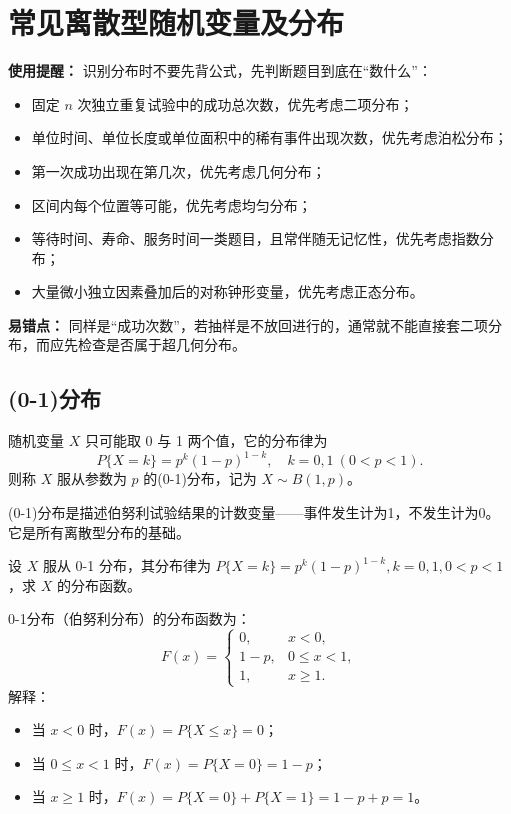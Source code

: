 ﻿\documentclass[lang=cn,11pt]{elegantbook}
\begin{document}
\section{常见离散型随机变量及分布}

\begin{note}
\textbf{使用提醒：} 识别分布时不要先背公式，先判断题目到底在“数什么”：
\begin{itemize}
    \item 固定 \(n\) 次独立重复试验中的成功总次数，优先考虑二项分布；
    \item 单位时间、单位长度或单位面积中的稀有事件出现次数，优先考虑泊松分布；
    \item 第一次成功出现在第几次，优先考虑几何分布；
    \item 区间内每个位置等可能，优先考虑均匀分布；
    \item 等待时间、寿命、服务时间一类题目，且常伴随无记忆性，优先考虑指数分布；
    \item 大量微小独立因素叠加后的对称钟形变量，优先考虑正态分布。
\end{itemize}

\textbf{易错点：} 同样是“成功次数”，若抽样是不放回进行的，通常就不能直接套二项分布，而应先检查是否属于超几何分布。
\end{note}

\subsection{(0-1)分布} \label{subsec:0-1-dist}
\begin{definition}[(0-1)分布]\label{def:0-1-dist}
随机变量 $X$ 只可能取 0 与 1 两个值，它的分布律为
\[
P\{X = k\} = p^k (1-p)^{1-k},\quad k=0,1\ (0 < p < 1).
\]
则称 $X$ 服从参数为 $p$ 的(0-1)分布，记为 $X \sim B(1,p)$。
\end{definition}

\begin{note}
(0-1)分布是描述伯努利试验结果的计数变量——事件发生计为1，不发生计为0。它是所有离散型分布的基础。
\end{note}


\begin{exercise}[（0-1）分布的分布函数] \label{exer:2-44}
设 $X$ 服从 0-1 分布，其分布律为 $P\{X=k\}=p^k(1-p)^{1-k}, k=0,1, 0<p<1$，求 $X$ 的分布函数。
\end{exercise}
\begin{solution}
0-1分布（伯努利分布）的分布函数为：
\[
F(x)=
\begin{cases}
0, & x<0, \\[6pt]
1-p, & 0\leqslant x<1, \\[6pt]
1, & x\geqslant1.
\end{cases}
\]
解释：
\begin{itemize}
    \item 当 $x<0$ 时，$F(x)=P\{X\leqslant x\}=0$；
    \item 当 $0\leqslant x<1$ 时，$F(x)=P\{X=0\}=1-p$；
    \item 当 $x\geqslant1$ 时，$F(x)=P\{X=0\}+P\{X=1\}=1-p+p=1$。
\end{itemize}
\end{solution}
\end{document}
